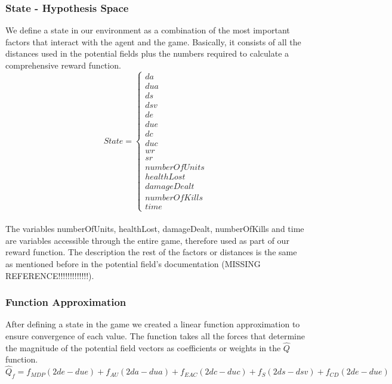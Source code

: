\subsubsection{State - Hypothesis Space}

We define a state in our environment as a combination of the most important factors that interact with the agent and the game. Basically, it consists of all the distances used in the potential fields plus the numbers required to calculate a comprehensive reward function. \\
\begin{displaymath}
                       State = \begin{cases}
                         da \\  dua \\  ds \\  dsv \\ de \\ due \\ dc \\ duc \\ wr \\ sr \\ numberOfUnits \\ healthLost \\ damageDealt \\ numberOfKills \\ time
                      \end{cases}
\end{displaymath}\\

The variables numberOfUnits, healthLost, damageDealt, numberOfKills and time are variables accessible through the entire game, therefore used as part of our reward function. The description the rest of the factors or distances is the same as mentioned before in the potential field's documentation (MISSING REFERENCE!!!!!!!!!!!!!). 

\subsubsection{Function Approximation}

After defining a state in the game we created a linear function approximation to ensure convergence of each value. The function takes all the forces that determine the magnitude of the potential field vectors as coefficients or weights in the $\hat{Q}$ function. \\ 

\begin{equation}
\hat{Q}_f = f_{MDP} (2de - due) + f_{AU} (2da - dua) + f_{EAC} (2dc - duc) + f_{S}  (2ds - dsv) + f_{CD} (2de - due) 
\end{equation}

